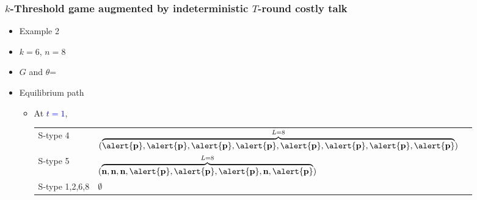 \documentclass[9pt,handout]{beamer}
\begin{document}
\begin{frame}
 \frametitle{$k$-Threshold game augmented by indeterministic $T$-round costly talk}

\begin{itemize}
\item Example 2
\item $k=6$, $n=8$
\item $G$ and $\theta$=
\begin{center}
\end{center}
\end{itemize}

\begin{itemize}
\item Equilibrium path
\begin{itemize}
\item 
{
At \textcolor{blue}{$t=1$}, 
\begin{table}[h]
\begin{tabular}{ll l}
S-type 4 & $(\overbrace{\alert{\textbf{p}},\alert{\textbf{p}},\alert{\textbf{p}},\alert{\textbf{p}},\alert{\textbf{p}},\alert{\textbf{p}},\alert{\textbf{p}},\alert{\textbf{p}}}^{L=8})$\\
S-type 5 & $(\overbrace{\textbf{n},\textbf{n},\textbf{n},\alert{\textbf{p}},\alert{\textbf{p}},\alert{\textbf{p}},\textbf{n},\alert{\textbf{p}}}^{L=8})$ \\
S-type 1,2,6,8 & $\emptyset$
\end{tabular}
\end{table}
}
\end{itemize}
\end{itemize}
\end{frame}
\end{document}
